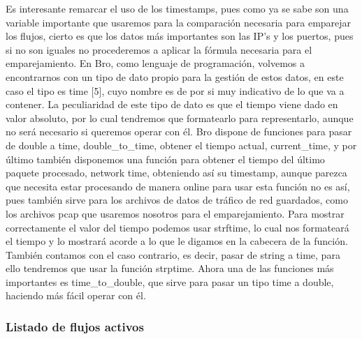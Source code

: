 {{{Es interesante remarcar el uso de los timestamps, pues como ya se sabe son una 
variable importante que usaremos para la comparación necesaria para emparejar 
los flujos, cierto es que los datos más importantes son las IP’s y los puertos, 
pues si no son iguales no procederemos a aplicar la fórmula necesaria para el 
emparejamiento.
\intro
En Bro, como lenguaje de programación, volvemos a encontrarnos con un tipo de 
dato propio para la gestión de estos datos, en este caso el tipo es time [5], 
cuyo nombre es de por si muy indicativo de lo que va a contener. La peculiaridad 
de este tipo de dato es que el tiempo viene dado en valor absoluto, por lo cual 
tendremos que formatearlo para representarlo, aunque no será necesario si 
queremos operar con él. Bro dispone de funciones para pasar de double a time, double_to_time, 
obtener el tiempo actual, current_time, y por último también disponemos una 
función para obtener el tiempo del último paquete procesado, network time, 
obteniendo así su timestamp, aunque parezca que necesita estar procesando de 
manera online para usar esta función no es así, pues también sirve para los 
archivos de datos de tráfico de red guardados, como los archivos pcap que 
usaremos nosotros para el emparejamiento. Para mostrar correctamente el valor 
del tiempo podemos usar strftime, lo cual nos formateará el tiempo y lo mostrará 
acorde a lo que le digamos en la cabecera de la función. También contamos con el 
caso contrario, es decir, pasar de string a time, para ello tendremos que usar la 
función strptime.
\intro
Ahora una de las funciones más importantes es time_to_double, que sirve para pasar 
un tipo time a double, haciendo más fácil operar con él.

\subsubsection{Listado de flujos activos}

}}}
